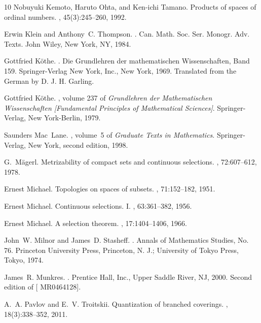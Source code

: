 \documentclass[11pt,leqno]{article}
\theoremstyle{plain}
\theoremstyle{plain}
\theoremstyle{plain}
\numberwithin{equation}{section}
\theoremstyle{nonumberplain}
\newcommand\1{{\bf 1}}
\begin{document}
\begin{thebibliography}{10}
Nobuyuki Kemoto, Haruto Ohta, and Ken-ichi Tamano.
\newblock Products of spaces of ordinal numbers.
, 45(3):245--260, 1992.

Erwin Klein and Anthony~C. Thompson.
.
\newblock Can. Math. Soc. Ser. Monogr. Adv. Texts. John Wiley, New York, NY,
  1984.

Gottfried K\"{o}the.
.
\newblock Die Grundlehren der mathematischen Wissenschaften, Band 159.
  Springer-Verlag New York, Inc., New York, 1969.
\newblock Translated from the German by D. J. H. Garling.

Gottfried K\"{o}the.
, volume 237 of {\em Grundlehren
  der Mathematischen Wissenschaften [Fundamental Principles of Mathematical
  Sciences]}.
\newblock Springer-Verlag, New York-Berlin, 1979.

Saunders Mac~Lane.
, volume~5 of {\em
  Graduate Texts in Mathematics}.
\newblock Springer-Verlag, New York, second edition, 1998.

G.~M{\"a}gerl.
\newblock Metrizability of compact sets and continuous selections.
, 72:607--612, 1978.

Ernest Michael.
\newblock Topologies on spaces of subsets.
, 71:152--182, 1951.

Ernest Michael.
\newblock Continuous selections. {I}.
, 63:361--382, 1956.

Ernest Michael.
\newblock A selection theorem.
, 17:1404--1406, 1966.

John~W. Milnor and James~D. Stasheff.
.
\newblock Annals of Mathematics Studies, No. 76. Princeton University Press,
  Princeton, N. J.; University of Tokyo Press, Tokyo, 1974.

James~R. Munkres.
.
\newblock Prentice Hall, Inc., Upper Saddle River, NJ, 2000.
\newblock Second edition of [ MR0464128].

A.~A. Pavlov and E.~V. Troitskii.
\newblock Quantization of branched coverings.
, 18(3):338--352, 2011.


\end{thebibliography}
\end{document}
